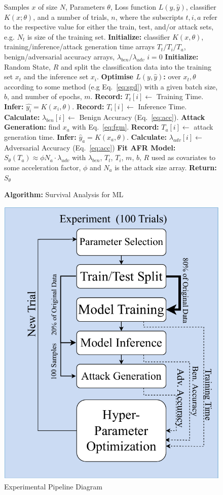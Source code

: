\documentclass[journal]{IEEEtran}
\begin{document}
\begin{figure}[h!]
    \caption{\textbf{Algorithm: }Survival Analysis for ML}
    \label{fig:alg}
\begin{algorithmic}
    \Require Samples $x$ of size $N$, Parameters $\theta$, Loss function $L(y, \hat{y})$, classifier $K(x; \theta)$, and a number of trials, $n$, where the subscripts $t,i,a$ refer to the respective value for either the train, test, and/or attack sets, e.g. $N_t$ is size of the training set.
    \State \textbf{Initialize:} classifier $K(x, \theta)$, training/inference/attack generation time arrays $T_t/T_i/T_a$, benign/adversarial accuracy arrays, $\lambda_{ben}/ \lambda_{adv}$
    \State $i = 0$
    \State \textbf{Initialize:} Random State, $R$ and split the classification data into the training set $x_t$ and the inference set $x_i$.
    \State \textbf{Optimise $L(y, \hat{y})$:} over $x_t, \theta$ according to some method (e.g Eq.~\ref{eq:sgd}) with a given batch size, $b$, and number of epochs, $m$.
    \State \textbf{Record:} $T_t[i] \gets$ Training Time.
    \State \textbf{Infer:}  $ \hat{y_i} = K(x_i, \theta) $.
    \State \textbf{Record:}  $ T_i[i] \gets $  Inference Time.
    \State \textbf{Calculate:}  $\lambda_{ben}[i] \gets $  Benign Accuracy (Eq.~\ref{eq:acc}).
    \State \textbf{Attack Generation: } find $x_a$ with Eq.~\ref{eq:fgm}.
    \State \textbf{Record:} $T_a[i] \gets$ attack generation time.
    \State \textbf{Infer:}  $ \hat{y}_a = K(x_a, \theta) $.
    \State \textbf{Calculate:}  $\lambda_{adv}[i] \gets $  Adversarial Accuracy (Eq.~\ref{eq:acc})
    \EndWhile
    \State \textbf{Fit AFR Model:} $S_{\theta}(T_a) \approx \phi N_a \cdot \lambda_{adv}$ with $\lambda_{ben}$, $T_t$, $T_i$, $m$, $b$, $R$ used as covariates to some acceleration factor, $\phi$ and  $N_a$ is the attack size array.
    \State \textbf{Return:} $S_{\theta}$
\end{algorithmic}
\end{figure}


\begin{figure}
    \centering
    \includegraphics[width=.35\textwidth]{plots/experiment.pdf}
    \caption{Experimental Pipeline Diagram}
    \label{fig:experiments}
\end{figure}
\end{document}
